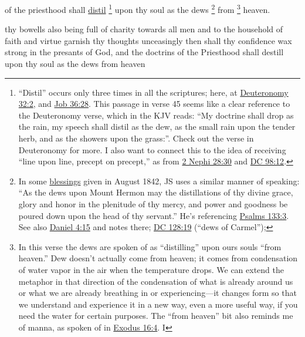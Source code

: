 		of the priesthood shall \hyperref[DISTIL]{distil}%
			\footnote{%
				``Distil'' occurs only three times in all the scriptures; here, at \hyperref[DEUTERONOMY-32-2]{Deuteronomy 32:2}, and \hyperref[JOB-36-28]{Job 36:28}. This passage in verse 45 seems like a clear reference to the Deuteronomy verse, which in the KJV reads: ``My doctrine shall drop as the rain, my speech shall distil as the dew, as the small rain upon the tender herb, and as the showers upon the grass:''. Check out the verse in Deuteronomy for more. I also want to connect this to the idea of receiving ``line upon line, precept on precept,'' as from \hyperref[2NEPHI-28-30]{2 Nephi 28:30} and \hyperref[DC98-12]{DC 98:12}.
				}
		upon thy soul as the dews%
			\footnote{%
				In some \hyperlink{EMS-1842-JS-16-23-AUG-1842-cc}{blessings} given in August 1842, JS uses a similar manner of speaking: ``As the dews upon Mount Hermon may the distillations of thy divine grace, glory and honor in the plenitude of thy mercy, and power and goodness be poured down upon the head of thy servant.'' He's referencing \hyperref[PSALMS-133-3]{Psalms 133:3}. See also \hyperref[DANIEL-4-15]{Daniel 4:15} and notes there; \hyperref[DC128-19]{DC 128:19} (``dews of Carmel''); 
				}
		from%
			\footnote{%
				In this verse the dews are spoken of as ``distilling'' upon ours souls ``from heaven.'' Dew doesn't actually come from heaven; it comes from condensation of water vapor in the air when the temperature drops. We can extend the metaphor in that direction of the condensation of what is already around us or what we are already breathing in or experiencing---it changes form so that we understand and experience it in a new way, even a more useful way, if you need the water for certain purposes. The ``from heaven'' bit also reminds me of manna, as spoken of in \hyperref[EXODUS-16-4]{Exodus 16:4}. I
				}
		heaven.
	
		\begin{framed}
		\scriptsize
			\begin{compactdesc}
				\item[JSP] thy bowells also being full of charity towards all men and to the household of faith and virtue garnish thy thoughts unceasingly then shall thy confidence wax strong in the presants of God, and the doctrins of the Priesthood shall destill upon thy soul as the dews from heaven
			\end{compactdesc}
		\end{framed}
		
